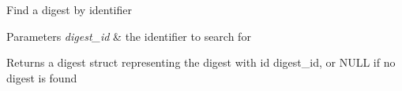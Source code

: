 Find a digest by identifier


\begin{DoxyParams}{Parameters}
{\em digest\+\_\+id} & the identifier to search for \\
\hline
\end{DoxyParams}
\begin{DoxyReturn}{Returns}
a digest struct representing the digest with id \textquotesingle{}digest\+\_\+id\textquotesingle{}, or N\+U\+LL if no digest is found 
\end{DoxyReturn}
